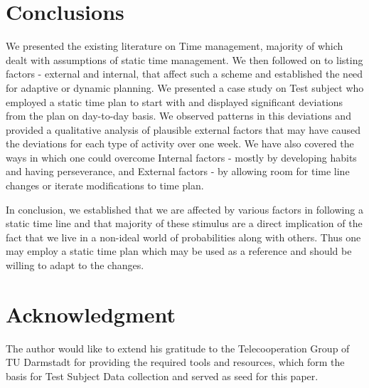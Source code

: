 \documentclass[conference]{IEEEtran}
\begin{document}
\section{Conclusions}
We presented the existing literature on Time management, majority of which dealt with assumptions of static time management. We then followed on to listing factors - external and internal, that affect such a scheme and established the need for adaptive or dynamic planning. We presented a case study on Test subject who employed a static time plan to start with and displayed significant deviations from the plan on day-to-day basis. We observed patterns in this deviations and provided a qualitative analysis of plausible external factors that may have caused the deviations for each type of activity over one week. We have also covered the ways in which one could overcome Internal factors - mostly by developing habits and having perseverance, and External factors - by allowing room for time line changes or iterate modifications to time plan. 

In conclusion, we established that we are affected by various factors in following a static time line and that majority of these stimulus are a direct implication of the fact that we live in a non-ideal world of probabilities along with others. Thus one may employ a static time plan which may be used as a reference and should be willing to adapt to the changes.

\section*{Acknowledgment}
The author would like to extend his gratitude to the Telecooperation Group of TU Darmstadt for providing the required tools and resources, which form the basis for Test Subject Data collection and served as seed for this paper.



\end{document}
